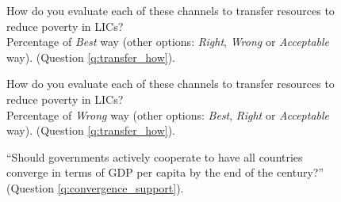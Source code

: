 \begin{figure}[h!]
    \caption[\textit{Best} way to transfer resources to LICs]{How do you evaluate each of these channels to transfer resources to reduce poverty in LICs?\\ Percentage of \textit{Best} way (other options: \textit{Right}, \textit{Wrong} or \textit{Acceptable} way). (Question \ref{q:transfer_how}).
    }\label{fig:transfer_how_above_one}
\end{figure}

\begin{figure}[h!]
    \caption[\textit{Wrong} way to transfer resources to LICs]{How do you evaluate each of these channels to transfer resources to reduce poverty in LICs?\\ Percentage of \textit{Wrong} way (other options: \textit{Best}, \textit{Right} or \textit{Acceptable} way). (Question \ref{q:transfer_how}).
    }\label{fig:transfer_how_negative}
\end{figure}

\begin{figure}[h!]
    \caption[Support for making all countries' GDP p.c. converge by 2100]{``Should governments actively cooperate to have all countries converge in terms of GDP per capita by the end of the century?'' (Question \ref{q:convergence_support}).
    }\label{fig:convergence_support}
\end{figure}

